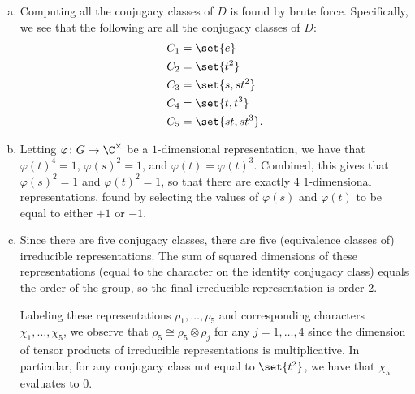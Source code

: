 \documentclass[10pt]{mypackage}
\begin{document}
\begin{solution}\hfill
  \begin{enumerate}[(a)]
    \item Computing all the conjugacy classes of $D$ is found by brute force. Specifically, we see that the following are all the conjugacy classes of $D$:
      \begin{align*}
        C_1 &= \set{e}\\
        C_2 &= \set{t^2}\\
        C_3 &= \set{s,st^2}\\
        C_4 &= \set{t,t^3}\\
        C_5 &= \set{st,st^3}.
      \end{align*}
    \item Letting $\varphi\colon G\rightarrow \C^{\times}$ be a $1$-dimensional representation, we have that $\varphi\left( t \right)^4 = 1$, $\varphi\left( s \right)^2 = 1$, and $\varphi\left( t \right) = \varphi\left( t \right)^3$. Combined, this gives that $\varphi\left( s \right)^2 = 1$ and $\varphi\left( t \right)^2 = 1$, so that there are exactly $4$ $1$-dimensional representations, found by selecting the values of $\varphi\left( s \right)$ and $\varphi\left( t \right)$ to be equal to either $+1$ or $-1$.
    \item Since there are five conjugacy classes, there are five (equivalence classes of) irreducible representations. The sum of squared dimensions of these representations (equal to the character on the identity conjugacy class) equals the order of the group, so the final irreducible representation is order $2$.

      Labeling these representations $\rho_1,\dots,\rho_5$ and corresponding characters $\chi_1,\dots,\chi_5$, we observe that $\rho_5\cong \rho_5\otimes \rho_j$ for any $j=1,\dots,4$ since the dimension of tensor products of irreducible representations is multiplicative. In particular, for any conjugacy class not equal to $\set{t^2}$, we have that $\chi_5$ evaluates to $0$.


\end{enumerate}
\end{solution}
\end{document}
